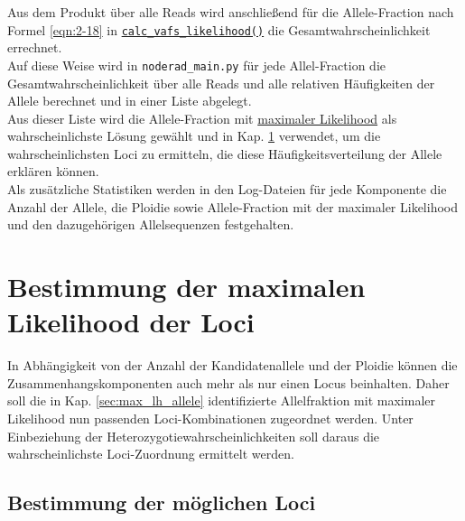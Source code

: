 Aus dem Produkt über alle Reads wird anschließend für die Allele-Fraction nach Formel \eqref{eqn:2-18} in \hyperref[schritt11]{\lstinline|calc_vafs_likelihood()|\label{schritt11txt}} die Gesamtwahrscheinlichkeit errechnet. \\

Auf diese Weise wird in \lstinline|noderad_main.py| für jede Allel-Fraction die Gesamtwahrscheinlichkeit über alle Reads und alle relativen Häufigkeiten der Allele berechnet und in einer Liste abgelegt. \\

Aus dieser Liste wird die Allele-Fraction mit \hyperref[schritt12]{maximaler Likelihood\label{schritt12txt}} als wahrscheinlichste Lösung gewählt und in Kap. \ref{sec:max_lh_loci} verwendet, um die wahrscheinlichsten Loci zu ermitteln, die diese Häufigkeitsverteilung der Allele erklären können.  \\

Als zusätzliche Statistiken werden in den Log-Dateien für jede Komponente die Anzahl der Allele, die Ploidie sowie Allele-Fraction mit der maximaler Likelihood und den dazugehörigen Allelsequenzen festgehalten.

\section{Bestimmung der maximalen Likelihood der Loci} \label{sec:max_lh_loci}

In Abhängigkeit von der Anzahl der Kandidatenallele und der Ploidie können die Zusammenhangskomponenten auch mehr als nur einen Locus beinhalten. Daher soll die in Kap. \ref{sec:max_lh_allele} identifizierte Allelfraktion mit maximaler Likelihood nun passenden Loci-Kombinationen zugeordnet werden. Unter Einbeziehung der Heterozygotiewahrscheinlichkeiten soll daraus die wahrscheinlichste Loci-Zuordnung ermittelt werden.

\subsection{Bestimmung der möglichen Loci} \label{subsec:comb_loci}

